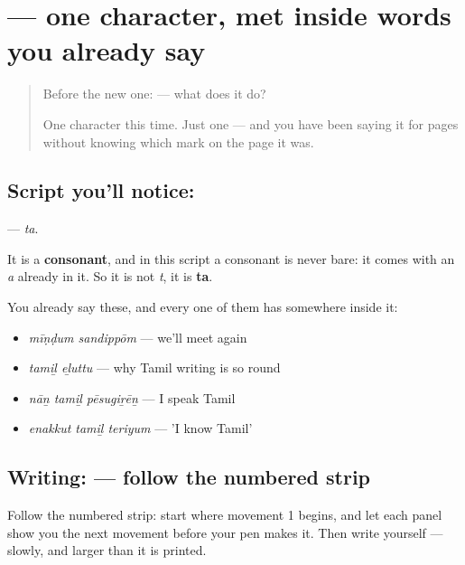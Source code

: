 \section[\texorpdfstring{\ta{த} (ta)}{த (ta)}]{ — one character, met inside words you already say}

\label{lesson:TA-S122-letter-ta}



\begin{quote}
Before the new one:  — what does it do?

One character this time. Just one — and you have been saying it for pages without knowing which mark on the page it was.
\end{quote}

\subsection*{Script you'll notice: }
\textbf{} — \emph{ta}.

It is a \textbf{consonant}, and in this script a consonant is never bare: it comes with an \emph{a} already in it. So it is not \emph{t}, it is \textbf{ta}.

You already say these, and every one of them has  somewhere inside it:

\begin{itemize}
\raggedright
  \item \textbf{ } \emph{mīṇḍum sandippōm} — we'll meet again
  \item \textbf{ } \emph{tamiḻ eḻuttu} — why Tamil writing is so round
  \item \textbf{  } \emph{nāṉ tamiḻ pēsugiṟēṉ} — I speak Tamil
  \item \textbf{  } \emph{enakkut tamiḻ teriyum} — 'I know Tamil'
\end{itemize}

\subsection*{Writing:  — follow the numbered strip}

Follow the numbered strip: start where movement 1 begins, and let each panel show you the next movement before your pen makes it. Then write  yourself — slowly, and larger than it is printed.

